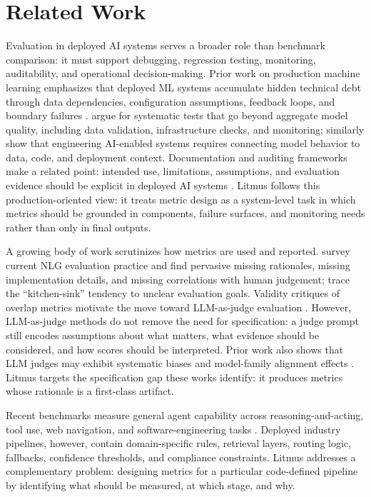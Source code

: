 \documentclass[11pt]{article}
\begin{document}
\section{Related Work}
\label{sec:related}

Evaluation in deployed AI systems serves a broader role than benchmark comparison: it must support debugging, regression testing, monitoring, auditability, and operational decision-making. Prior work on production machine learning emphasizes that deployed ML systems accumulate hidden technical debt through data dependencies, configuration assumptions, feedback loops, and boundary failures \citep{NIPS2015_86df7dcf}. \citet{8258038} argue for systematic tests that go beyond aggregate model quality, including data validation, infrastructure checks, and monitoring; \citet{8804457} similarly show that engineering AI-enabled systems requires connecting model behavior to data, code, and deployment context. Documentation and auditing frameworks make a related point: intended use, limitations, assumptions, and evaluation evidence should be explicit in deployed AI systems \citep{10.1145/3287560.3287596,10.1145/3458723,10.1145/3351095.3372873}. Litmus follows this production-oriented view: it treats metric design as a system-level task in which metrics should be grounded in components, failure surfaces, and monitoring needs rather than only in final outputs.

A growing body of work scrutinizes how metrics are used and reported. \citet{schmidtova-etal-2024-automatic-metrics} survey current NLG evaluation practice and find pervasive missing rationales, missing implementation details, and missing correlations with human judgement; \citet{zhou-etal-2022-deconstructing} trace the ``kitchen-sink'' tendency to unclear evaluation goals. Validity critiques of overlap metrics \citep{reiter-2018-structured,papineni-etal-2002-bleu,lin-2004-rouge} motivate the move toward LLM-as-judge evaluation \citep{liu-etal-2023-g,fu-etal-2024-gptscore}. However, LLM-as-judge methods do not remove the need for specification: a judge prompt still encodes assumptions about what matters, what evidence should be considered, and how scores should be interpreted. Prior work also shows that LLM judges may exhibit systematic biases and model-family alignment effects \citep{zheng2023judging}. Litmus targets the specification gap these works identify: it produces metrics whose rationale is a first-class artifact.

Recent benchmarks measure general agent capability across reasoning-and-acting, tool use, web navigation, and software-engineering tasks \citep{yao2023react,qin2024toolllm,liu2024agentbench,zhou2024webarena,jimenez2024swebench}. Deployed industry pipelines, however, contain domain-specific rules, retrieval layers, routing logic, fallbacks, confidence thresholds, and compliance constraints. Litmus addresses a complementary problem: designing metrics for a particular code-defined pipeline by identifying what should be measured, at which stage, and why.
\end{document}
